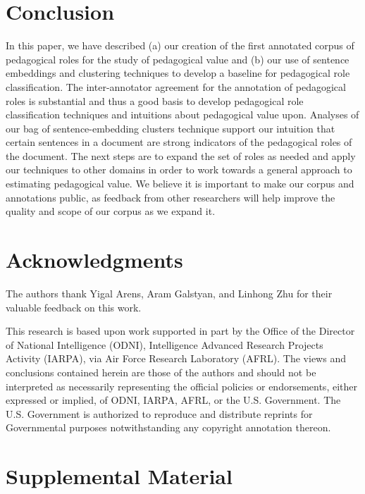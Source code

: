 \documentclass[11pt,a4paper]{article}
\begin{document}
\section{Conclusion}
\label{sec:conclusion}

In this paper, we have described (a) our creation of the first annotated corpus of pedagogical roles for the study of pedagogical value and (b) our use of sentence embeddings and clustering techniques to develop a baseline for pedagogical role classification. The inter-annotator agreement for the annotation of pedagogical roles is substantial and thus a good basis to develop pedagogical role classification techniques and intuitions about pedagogical value upon. Analyses of our bag of sentence-embedding clusters technique support our intuition that certain sentences in a document are strong indicators of the pedagogical roles of the document. The next steps are to expand the set of roles as needed and apply our techniques to other domains in order to work towards a general approach to estimating pedagogical value. We believe it is important to make our corpus and annotations public, as feedback from other researchers will help improve the quality and scope of our corpus as we expand it. 

\section*{Acknowledgments}
The authors thank Yigal Arens, Aram Galstyan, and Linhong Zhu for their valuable feedback on this work.

This research is based upon work supported in part by the Office of
the Director of National Intelligence (ODNI), Intelligence Advanced
Research Projects Activity (IARPA), via Air Force Research Laboratory
(AFRL). The views and conclusions contained herein are those of the
authors and should not be interpreted as necessarily representing the
official policies or endorsements, either expressed or implied, of
ODNI, IARPA, AFRL, or the U.S. Government. The U.S. Government is
authorized to reproduce and distribute reprints for Governmental
purposes notwithstanding any copyright annotation thereon.





\appendix

\section{Supplemental Material}
\label{sec:supplemental}
\end{document}
